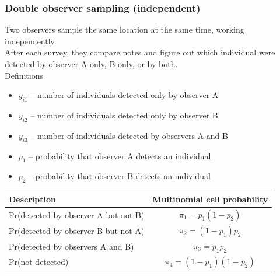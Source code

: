 \documentclass[color=usenames,dvipsnames]{beamer}\usepackage[]{graphicx}\usepackage[]{color}
\begin{document}
\begin{frame}
  \frametitle{Double observer sampling (independent)}
  \small
  Two observers sample the same location at the same time, working independently. \\
  \pause
  \vfill
  After each survey, they compare notes and figure out which
  individual were detected by observer A only, B only, or by both. \\
  \pause
  \vfill
  Definitions
  \begin{itemize}
    \setlength\itemsep{0.5pt}
    \item $y_{i1}$ -- number of individuals detected only by observer A
    \item $y_{i2}$ -- number of individuals detected only by observer B
    \item $y_{i3}$ -- number of individuals detected by observers A and B
    \item $p_1$ -- probability that observer A detects an individual 
    \item $p_2$ -- probability that observer B detects an individual 
  \end{itemize}
  \pause \vfill
  \footnotesize
  \begin{tabular}{lc}
    \hline
    \centering
    Description & Multinomial cell probability \\
    \hline
    Pr(detected by observer A but not B) & $\pi_1 = p_1(1-p_2)$ \\
    Pr(detected by observer B but not A) & $\pi_2 = (1-p_1)p_2$ \\
    Pr(detected by observers A and B) & $\pi_3 = p_1p_2$ \\
    Pr(not detected) & $\pi_4 = (1-p_1)(1-p_2)$ \\
    \hline
  \end{tabular}
\end{frame}
\end{document}
